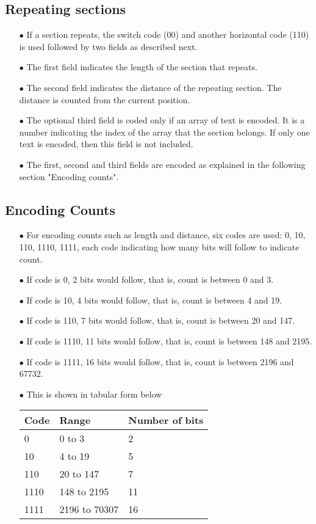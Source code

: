 \documentclass[]{article}
\begin{document}
\subsection{Repeating sections}
\begin{itemize}
	\item[$\bullet$] If a section repeats, the switch code (00) and another horizontal code (110) is used followed by two fields as described next.
  	\item[$\bullet$] The first field indicates the length of the section that repeats.
	\item[$\bullet$] The second field indicates the distance of the repeating section.  The distance is counted from the current position.
	\item[$\bullet$] The optional third field is coded only if an array of text is encoded.  It is a number indicating the index of the array that the section belongs.  If only one text is encoded, then this field is not included. 
	\item[$\bullet$] The first, second and third fields are encoded as explained in the following section "Encoding counts".
\end{itemize}

\subsection{Encoding Counts}
\begin{itemize}
	\item[$\bullet$] For encoding counts such as length and distance, six codes are used: 0, 10, 110, 1110, 1111, each code indicating how many bits will follow to indicate count.
	\item[$\bullet$] If code is 0, 2 bits would follow, that is, count is between 0 and 3.
	\item[$\bullet$] If code is 10, 4 bits would follow, that is, count is between 4 and 19.
	\item[$\bullet$] If code is 110, 7 bits would follow, that is, count is between 20 and 147.
	\item[$\bullet$] If code is 1110, 11 bits would follow, that is, count is between 148 and 2195.
	\item[$\bullet$] If code is 1111, 16 bits would follow, that is, count is between 2196 and 67732.
	\item[$\bullet$] This is shown in tabular form below
	\item[] \begin{tabular}{ | l | l | l |} \hline
	\textbf{Code} & \textbf{Range} & \textbf{Number of bits} \\ \hline
	0 & 0 to 3 & 2 \\ \hline
	10 & 4 to 19 & 5 \\ \hline
	110 & 20 to 147 & 7 \\ \hline
	1110 & 148 to 2195 & 11 \\ \hline
	1111 & 2196 to 70307 & 16 \\ \hline
\end{tabular}
\end{itemize}
\end{document}
